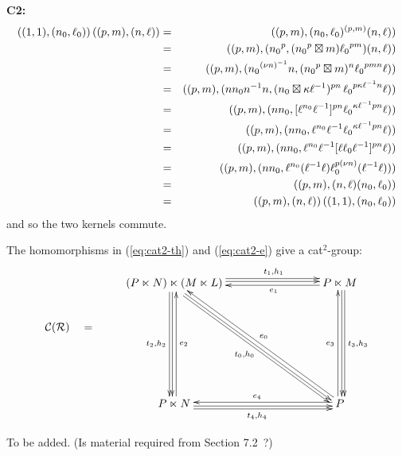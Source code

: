 \medskip\noindent
\textbf{C2:} 
\vspace{-4mm}
\begin{eqnarray*} 
((1,1),(n_0, \ell_0))\,((p,m), (n, \ell)) 
  & = & ((p,m),(n_0,\ell_0)^{(p,m)}(n,\ell)) \\
  & = & ((p,m),({n_0}^p,({n_0}^p \boxtimes m) {\ell_0}^{pm}) (n,\ell)) \\
  & = & ((p,m),({n_0}^{(\nu n)^{-1}} n, ({n_0}^p \boxtimes m)^n
           {\ell_0}^{pmn} \ell)) \\
  & = & ((p,m),(nn_0n^{-1}n, (n_0 \boxtimes \kappa\ell^{-1})^{pn}\,
           {\ell_0}^{p \kappa \ell^{-1} n} \ell)) \\
  & = & ((p,m),(nn_0, [\ell^{n_0}\ell^{-1}]^{pn} 
           {\ell_0}^{\kappa\ell^{-1}pn} \ell)) \\
  & = & ((p,m),(nn_0,\ell^{n_0}\ell^{-1}{\ell_0}^{\kappa\ell^{-1}pn} \ell)) \\
  & = & ((p,m),(nn_0,\ell^{n_0}\ell^{-1} 
           [\ell\ell_0\ell^{-1}]^{pn} \ell)) \\
  & = & ((p,m),(nn_0,\ell^{n_0} (\ell^{-1} \ell) 
           \ell_0^{p(\nu n)} (\ell^{-1}\ell))) \\
  & = & ((p,m),(n,\ell)(n_0,\ell_0)) \\
  & = & ((p,m),(n,\ell))\,((1,1),(n_0, \ell_0))  
\end{eqnarray*}
and so the two kernels commute. 

\medskip
\begin{thm}
The homomorphisms in (\ref{eq:cat2-th}) and (\ref{eq:cat2-e}) 
give a cat$^2$-group:
\begin{equation} \label{eq:cat2-sdp}
\vcenter{\xymatrix{
 & (P \ltimes N) \ltimes (M \ltimes L)
      \ar[ddd] <-0.4ex>  \ar[ddd] <-1.0ex>_{t_2,h_2}
      \ar[rrr] <+0.4ex>  \ar[rrr] <+1.0ex>^(0.6){t_1,h_1}
      \ar[dddrrr] <-0.4ex>  \ar[dddrrr] <-1.0ex>_{t_0,h_0}
    &&&  P \ltimes M
            \ar[lll]<+0.4ex>^(0.4){e_1}
            \ar[ddd]<+0.4ex>  \ar[ddd] <+1.0ex>^{t_3,h_3}  \\
\calC(\calR) \quad = 
 &   &&&   \\
 &   &&&   \\
 & P \ltimes N
    \ar[uuu] <-0.4ex>_{e_2}
    \ar[rrr] <-0.4ex>  \ar[rrr] <-1.0ex>_{t_4,h_4} 
    &&&  P \ar[uuu]<+0.4ex>^{e_3}   \ar[lll]<-0.4ex>_{e_4} 
           \ar[uuulll] <-0.4ex>_{e_0}
 \\
}} 
\end{equation}
\end{thm}
\begin{pf}
To be added.  (Is material required from Section 7.2~?)
\end{pf}


